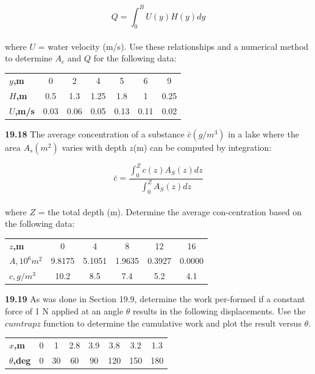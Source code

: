 \documentclass[../main.tex]{subfiles}
\begin{document}
\begin{multicols}{2}
	$$Q=\int^{B}_{0}U(y)H(y)dy$$\\
where $U$ = water velocity (m/s). Use these relationships and
a numerical method to determine $A_c$ and $Q$ for the following
data:\\
\begin{tabular}{lcccccc}
	\hline
	\scriptsize{\textbf{$y$,m}} & \scriptsize{0} & \scriptsize{2} & \scriptsize{4} & \scriptsize{5} & \scriptsize{6} & \scriptsize{9}\\
	\scriptsize{\textbf{$H$,m}} & \scriptsize{0.5} & \scriptsize{1.3} & \scriptsize{1.25} & \scriptsize{1.8} & \scriptsize{1} & \scriptsize{0.25}\\
	\scriptsize{\textbf{$U$,m/s}} & \scriptsize{0.03} & \scriptsize{0.06} & \scriptsize{0.05} & \scriptsize{0.13} & \scriptsize{0.11} & \scriptsize{0.02}\\ 	\hline
\end{tabular}
\vspace{0.2in}

\textbf{19.18} The average concentration of a substance $\bar{c}(g/m^3
)$ in a lake where the area $A_{s}(m^2)$ varies with depth $z$(m) can be
computed by integration:
	
	$$\bar{c} = \dfrac{\int^{Z}_{0}c(z)A_{S}(z)dz} {\int^{Z}_{0} A_{S}(z)dz}$$\\
where $Z$ = the total depth (m). Determine the average con-centration based on the following data:\\
\begin{tabular}{lccccc}
	\hline
	\scriptsize{\textbf{$z$,m}} & \scriptsize{0} & \scriptsize{4} & \scriptsize{8} & \scriptsize{12} & \scriptsize{16}\\
	\scriptsize{\textbf{$A,10^{6}m^{2}$}} & \scriptsize{9.8175} & \scriptsize{5.1051} & \scriptsize{1.9635} & \scriptsize{0.3927} & \scriptsize{0.0000}\\
	\scriptsize{\textbf{$c, g/m^{3}$}} & \scriptsize{10.2} & \scriptsize{8.5} & \scriptsize{7.4} & \scriptsize{5.2} & \scriptsize{4.1}\\ 	\hline
\end{tabular}

\textbf{19.19} As was done in Section 19.9, determine the work per-formed if a constant force of 1 N applied at an angle $\theta$ results
in the following displacements. Use the $cumtrapz$ function to
determine the cumulative work and plot the result versus $\theta$. \\
\begin{tabular}{lccccccc}
	\hline
	\scriptsize{\textbf{$x$,m}} & \scriptsize{0} & \scriptsize{1} & \scriptsize{2.8} & \scriptsize{3.9} & \scriptsize{3.8} & \scriptsize{3.2} & \scriptsize{1.3}\\
	\scriptsize{\textbf{$\theta$,deg}} & \scriptsize{0} & \scriptsize{30} & \scriptsize{60} & \scriptsize{90} & \scriptsize{120} & \scriptsize{150} & \scriptsize{180}\\ \hline
\end{tabular}


\end{multicols}
\end{document}
